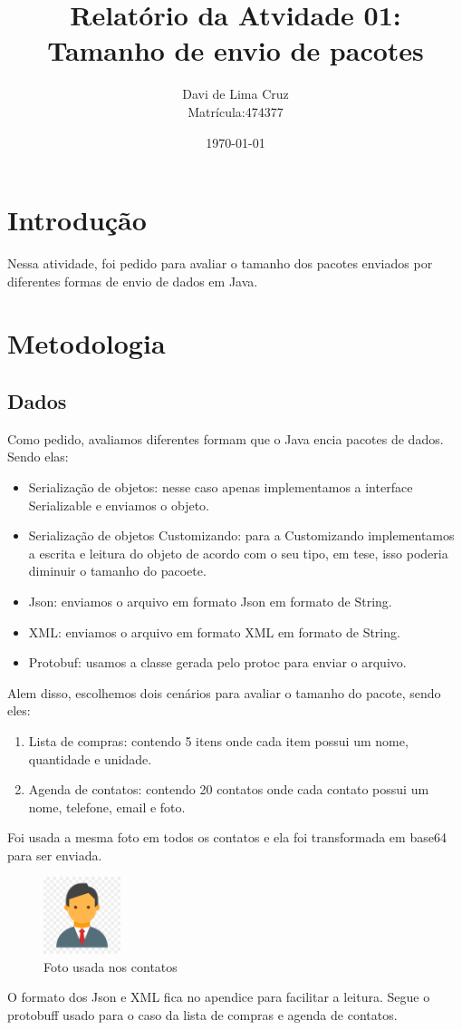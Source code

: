 \documentclass{article}
\author{Davi de Lima Cruz \\ Matrícula:474377}
\title{Relatório da Atvidade 01: Tamanho de envio de pacotes}
\date{\today}
\begin{document}
\maketitle
\section{Introdução}
Nessa atividade, foi pedido para avaliar o tamanho dos pacotes enviados por diferentes formas de envio de dados em Java.


\section{Metodologia}

\subsection{Dados}
Como pedido, avaliamos diferentes formam que o Java encia pacotes de dados. Sendo elas:
\begin{itemize}
    \item Serialização de objetos: nesse caso apenas implementamos a interface Serializable e enviamos o objeto.
    \item Serialização de objetos Customizando: para a Customizando implementamos a escrita e leitura do objeto de acordo com o seu tipo, em tese, isso poderia diminuir o tamanho do pacoete.
    \item Json: enviamos o arquivo em formato Json em formato de String.
    \item XML: enviamos o arquivo em formato XML em formato de String.
    \item Protobuf: usamos a classe gerada pelo protoc para enviar o arquivo.
\end{itemize}
Alem disso, escolhemos dois cenários para avaliar o tamanho do pacote, sendo eles:
\begin{enumerate}
    \item Lista de compras: contendo 5 itens onde cada item possui um nome, quantidade e unidade.
    \item Agenda de contatos: contendo 20 contatos onde cada contato possui um nome, telefone, email e foto.
\end{enumerate}
\newpage
Foi usada a mesma foto em todos os contatos e ela foi transformada em base64 para ser enviada.
\begin{figure}[H]
    \centering
    \includegraphics[width=0.2\textwidth]{../client/src/main/java/data/foto.png}
    \caption{Foto usada nos contatos}
\end{figure}
O formato dos Json e XML fica no apendice para facilitar a leitura. Segue o protobuff usado para o caso da lista de compras e agenda de contatos.
\end{document}

